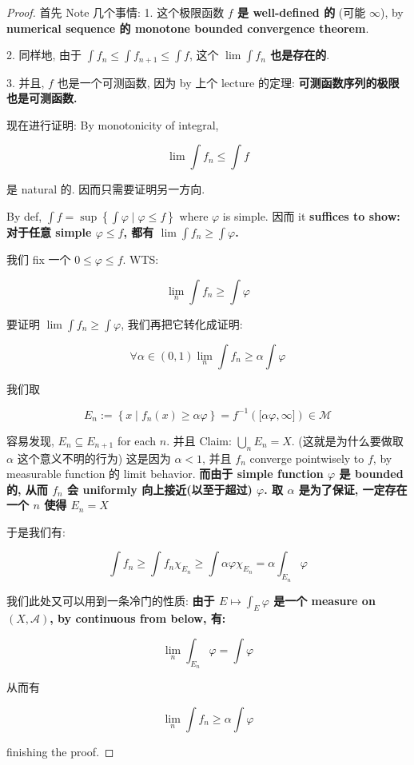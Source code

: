 \begin{proof}

首先 Note 几个事情: 1. 这个极限函数 \textbf{\(f\) 是 well-defined 的} (可能 \(\infty\)), by \textbf{numerical sequence 的 monotone bounded convergence theorem}.

2. 同样地, 由于 \(\int f_{n} \leq \int f_{n + 1} \leq \int f\), 这个 \textbf{\(\lim\int f_{n}\) 也是存在的}.

3. 并且, \(f\) 也是一个可测函数, 因为 by 上个 lecture 的定理: \textbf{可测函数序列的极限也是可测函数.}

现在进行证明: By monotonicity of integral,

\[\lim\int f_{n} \leq \int f\]

是 natural 的. 因而只需要证明另一方向.

By def, \(\int f = \sup\left\{ {\int\varphi \mid \varphi \leq f} \right\}\) where \(\varphi\) is simple. 因而 it \textbf{suffices to show: 对于任意 simple \(\varphi \leq f\), 都有 \(\lim\int f_{n} \geq \int\varphi\).}

我们 fix 一个 \(0 \leq \varphi \leq f\). WTS:

\[\lim\limits_{n}\int f_{n} \geq \int\varphi\]

要证明 \(\lim\int f_{n} \geq \int\varphi\), 我们再把它转化成证明:

\[\forall\alpha \in (0,1)\lim\limits_{n}\int f_{n} \geq \alpha\int\varphi\]

我们取

\[E_{n} := \left\{ {x \mid f_{n}(x) \geq \alpha\varphi} \right\} = f^{- 1}(\lbrack\alpha\varphi,\infty\rbrack) \in \mathcal{M}\]

容易发现, \(E_{n} \subseteq E_{n + 1}\) for each \(n\). 并且 Claim: \(\bigcup_{n}E_{n} = X\). (这就是为什么要做取 \(\alpha\) 这个意义不明的行为) 这是因为 \(\alpha < 1\), 并且 \(f_{n}\) converge pointwisely to \(f\), by measurable function 的 limit behavior. \textbf{而由于 simple function \(\varphi\) 是 bounded 的, 从而 \(f_{n}\) 会 uniformly 向上接近(以至于超过) \(\varphi\). 取 \(\alpha\) 是为了保证, 一定存在一个 \(n\) 使得 \(E_{n} = X\)}

于是我们有:

\[\int f_{n} \geq \int f_{n}\chi_{E_{n}} \geq \int\alpha\varphi\chi_{E_{n}} = \alpha\int_{E_{n}}\varphi\]

我们此处又可以用到一条冷门的性质: \textbf{由于 \(E\mapsto\int_{E}\varphi\) 是一个 measure on \((X,\mathcal{A})\), by continuous from below, 有:}

\[\lim\limits_{n}\int_{E_{n}}\varphi = \int\varphi\]

从而有

\[\lim\limits_{n}\int f_{n} \geq \alpha\int\varphi\]

finishing the proof.

\end{proof}

